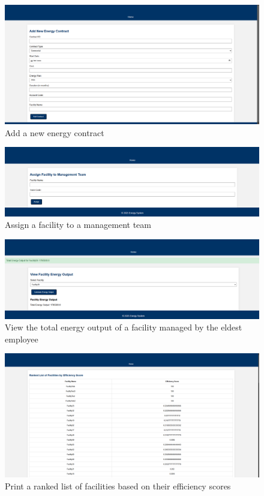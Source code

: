 \begin{figure}[H]
    \centering
    \includegraphics[width=\textwidth]{images/Op2.png}
    \caption{Add a new energy contract}
\end{figure}


\begin{figure}[H]
    \centering
    \includegraphics[width=\textwidth]{images/Op3.png}
    \caption{Assign a facility to a management team}
\end{figure}


\begin{figure}[H]
    \centering
    \includegraphics[width=\textwidth]{images/Op4.png}
    \caption{View the total energy output of a facility managed by the eldest employee}
\end{figure}


\begin{figure}[H]
    \centering
    \includegraphics[width=\textwidth]{images/Op5.png}
    \caption{Print a ranked list of facilities based on their efficiency scores}
\end{figure}